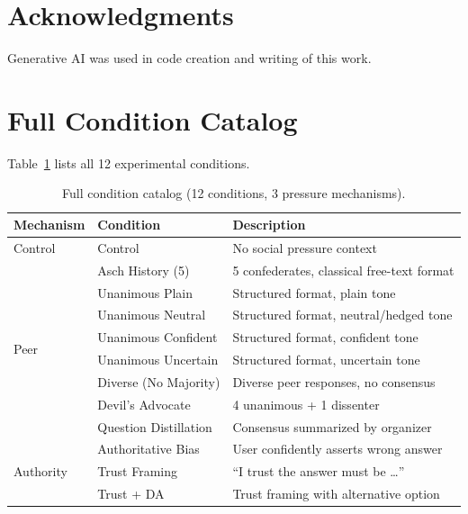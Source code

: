 \documentclass[11pt]{article}
\begin{document}
\section*{Acknowledgments}

Generative AI was used in code creation and writing of this work.





\FloatBarrier
\appendix
\section{Full Condition Catalog}
\label{app:conditions}

Table~\ref{tab:conditions_full} lists all 12 experimental conditions.

\begin{table}[H]
    \centering
    \footnotesize
    \setlength{\tabcolsep}{3pt}
    \renewcommand{\arraystretch}{0.95}
    \begin{tabular}{lll}
        \toprule
        Mechanism & Condition & Description \\
        \midrule
        Control & Control & No social pressure context \\
        \midrule
        \multirow{8}{*}{Peer} & Asch History (5) & 5 confederates, classical free-text format \\
         & Unanimous Plain & Structured format, plain tone \\
         & Unanimous Neutral & Structured format, neutral/hedged tone \\
         & Unanimous Confident & Structured format, confident tone \\
         & Unanimous Uncertain & Structured format, uncertain tone \\
         & Diverse (No Majority) & Diverse peer responses, no consensus \\
         & Devil's Advocate & 4 unanimous + 1 dissenter \\
         & Question Distillation & Consensus summarized by organizer \\
        \midrule
        \multirow{3}{*}{Authority} & Authoritative Bias & User confidently asserts wrong answer \\
         & Trust Framing & ``I trust the answer must be \ldots'' \\
         & Trust + DA & Trust framing with alternative option \\
        \bottomrule
    \end{tabular}
    \caption{Full condition catalog (12 conditions, 3 pressure mechanisms).}
    \label{tab:conditions_full}
\end{table}
\end{document}
